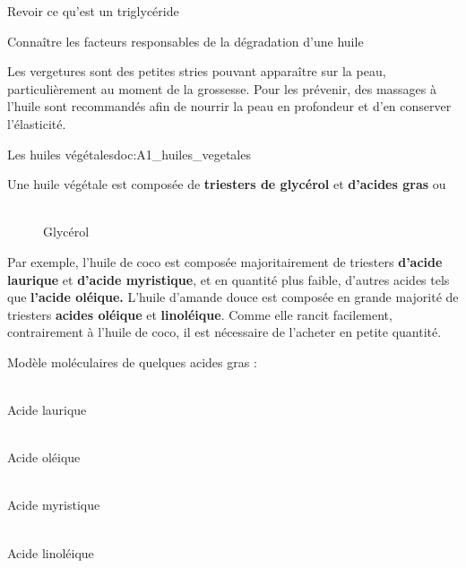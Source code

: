 \teteTermStssAlim



\begin{objectifs}
  \item Revoir ce qu'est un triglycéride
  \item Connaître les facteurs responsables de la dégradation d'une huile
\end{objectifs}

\begin{contexte}
  Les vergetures sont des petites stries pouvant apparaître sur la peau, particulièrement au moment de la grossesse. 
  Pour les prévenir, des massages à l’huile sont recommandés afin de nourrir la peau en profondeur et d’en conserver l’élasticité.
  
\end{contexte}


\begin{doc}{Les huiles végétales}{doc:A1_huiles_vegetales}
  \begin{importants}
    Une huile végétale est composée de \textbf{triesters de glycérol} et \textbf{d'acides gras}  ou 
  \end{importants}
  
  \begin{wrapfigure}{r}{0.22\linewidth}
    \centering
     \\[4pt]
    {\small Glycérol}
  \end{wrapfigure}
  
  Par exemple, l'huile de coco est composée majoritairement de triesters \textbf{d'acide laurique} et \textbf{d'acide myristique}, et en quantité plus faible, d'autres acides tels que \textbf{l'acide oléique.}
  L'huile d'amande douce est composée en grande majorité de triesters \textbf{acides oléique} et \textbf{linoléique}.
  Comme elle rancit facilement, contrairement à l'huile de coco, il est nécessaire de l'acheter en petite quantité.
  
  \begin{center}
    Modèle moléculaires de quelques acides gras :
  \end{center}
  \vspace*{-24pt}
  \begin{multicols}{2}
    \centering
     \\
    {\small Acide laurique}
    
     \\
    {\small Acide oléique}
    
     \\
    {\small Acide myristique}
    
     \\
    {\small Acide linoléique}
  \end{multicols}
\end{doc}

